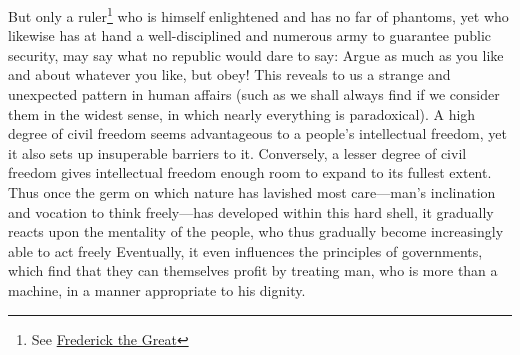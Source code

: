 \documentclass[11pt,twocolumn]{ltugboat}
\begin{document}
But only a ruler\footnote{See  \href{http://en.wikipedia.org/wiki/Frederick_the_Great}{Frederick the Great}} who is himself enlightened and has no far of phantoms, yet who likewise has at hand a well-disciplined and numerous army to guarantee public security, may say what no republic would dare to say: Argue as much as you like and about whatever you like, but obey! This reveals to us a strange and unexpected pattern in human affairs (such as we shall always find if we consider them in the widest sense, in which nearly everything is paradoxical). A high degree of civil freedom seems advantageous to a people's intellectual freedom, yet it also sets up insuperable barriers to it. Conversely, a lesser degree of civil freedom gives intellectual freedom enough room to expand to its fullest extent. Thus once the germ on which nature has lavished most care—man's inclination and vocation to think freely—has developed within this hard shell, it gradually reacts upon the mentality of the people, who thus gradually become increasingly able to act freely Eventually, it even influences the principles of governments, which find that they can themselves profit by treating man, who is more than a machine, in a manner appropriate to his dignity.
\end{document}
